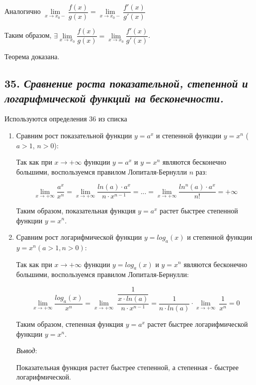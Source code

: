 Аналогично $\lim\limits_{x \rightarrow x_0-}{\dfrac{f(x)}{g(x)}}=\lim\limits_{x \rightarrow x_0-}{\dfrac{f'(x)}{g'(x)}}$

Таким образом, $\exists\lim\limits_{x \rightarrow x_0}{\dfrac{f(x)}{g(x)}}=\lim\limits_{x \rightarrow x_0}{\dfrac{f'(x)}{g'(x)}}$.

Теорема доказана.
\newpage 
\subsection*{35. \textit{Сравнение роста показательной, степенной и логарифмической функций на бесконечности.}}
\begin{Quote2} 
\small\centering 

Используются определения 36 из списка \end{Quote2} 
\begin{enumerate}

\item Сравним рост показательной функции $y = a^x$ и степенной функции $y = x^n$ ($a > 1$, $n > 0$):

Так как при $x \rightarrow +\infty$ функции $y = a^x$ и $y = x^n$ являются бесконечно большими, воспользуемся правилом Лопиталя-Бернулли $n$ раз:

$$\lim\limits_{x \rightarrow +\infty}{\dfrac{a^x}{x^n}} = \lim\limits_{x \rightarrow +\infty}{\dfrac{ln(a)\cdot a^x}{n\cdot x^{n - 1}}} =...=\lim\limits_{x \rightarrow +\infty}{\dfrac{ln^n(a)\cdot a^x}{n!}} = +\infty
    $$

Таким образом, показательная функция $y = a^x$ растет быстрее степенной функции $y = x^n$.
\item Сравним рост логарифмической функции $y = log_a(x)$ и степенной функции $y = x^n (a > 1, n > 0)$:

Так как при $x \rightarrow +\infty$ функции $y  = log_a(x)$ и $y = x^n$ являются бесконечно большими, воспользуемся правилом Лопиталя-Бернулли:

$$\lim\limits_{x \rightarrow +\infty}{\dfrac{ log_a(x)}{x^n}} 
    = \lim\limits_{x \rightarrow +\infty}{\ \dfrac{\dfrac{1}{x\cdot ln(a)}}{n\cdot x^{n - 1}}} 
    =\dfrac{1}{n\cdot ln(a)}\cdot \lim\limits_{x \rightarrow +\infty}{\ \dfrac{1}{x^{n}}}
    = 0
    $$

Таким образом, степенная функция $y = a^x$ растет быстрее логарифмической функции $y = x^n$.

\textit{Вывод}:

Показательная функция растет быстрее степенной, а степенная - быстрее логарифмической.

\end{enumerate}
\newpage 
